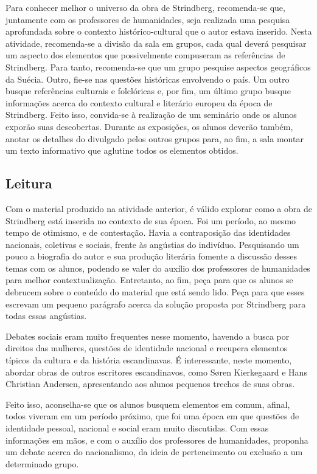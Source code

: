 \documentclass[12pt]{extarticle}
\begin{document}
Para conhecer melhor o universo da obra de Strindberg,
recomenda-se que, juntamente com os professores de humanidades, seja
realizada uma pesquisa aprofundada sobre o contexto histórico-cultural
que o autor estava inserido. Nesta atividade, recomenda-se a divisão da
sala em grupos, cada qual deverá pesquisar um aspecto dos elementos que
possivelmente compuseram as referências de Strindberg. Para tanto,
recomenda-se que um grupo pesquise aspectos geográficos da Suécia.
Outro, fie-se nas questões históricas envolvendo o país. Um outro busque
referências culturais e folclóricas e, por fim, um último grupo busque
informações acerca do contexto cultural e literário europeu da época de
Strindberg. Feito isso, convida-se à realização de um seminário onde os
alunos exporão suas descobertas. Durante as exposições, os alunos
deverão também, anotar os detalhes do divulgado pelos outros grupos
para, ao fim, a sala montar um texto informativo que aglutine todos os
elementos obtidos.

\subsection{Leitura}

Com o material produzido na atividade anterior, é válido
explorar como a obra de Strindberg está inserida no contexto de sua
época. Foi um período, ao mesmo tempo de otimismo, e de contestação.
Havia a contraposição das identidades nacionais, coletivas e sociais,
frente às angústias do indivíduo. Pesquisando um pouco a biografia do
autor e sua produção literária fomente a discussão desses temas com os
alunos, podendo se valer do auxílio dos professores de humanidades para
melhor contextualização. Entretanto, ao fim, peça para que os alunos se
debrucem sobre o conteúdo do material que está sendo lido. Peça para que
esses escrevam um pequeno parágrafo acerca da solução proposta por
Strindberg para todas essas angústias.




Debates sociais eram muito frequentes nesse momento, havendo a busca por
direitos das mulheres, questões de identidade nacional e
recupera elementos típicos da cultura e da história escandinavas. É
interessante, neste momento, abordar obras de outros escritores
escandinavos, como Søren Kierkegaard e Hans Christian Andersen,
apresentando aos alunos pequenos trechos de suas obras.

Feito isso, aconselha-se que os alunos busquem elementos em comum,
afinal, todos viveram em um período próximo, que foi uma época em que
questões de identidade pessoal, nacional e social eram muito discutidas.
Com essas informações em mãos, e com o auxílio dos professores de
humanidades, proponha um debate acerca do nacionalismo, da ideia de
pertencimento ou exclusão a um determinado grupo.
\end{document}
